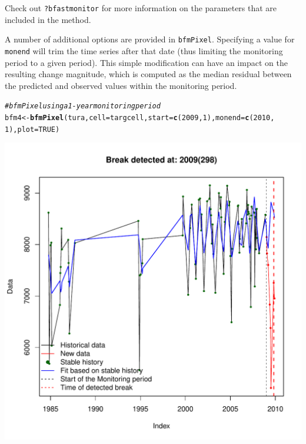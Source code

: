 \documentclass{article}\usepackage[]{graphicx}\usepackage[]{color}
\makeatletter
\def\maxwidth{ %
  \ifdim\Gin@nat@width>\linewidth
    \linewidth
  \else
    \Gin@nat@width
  \fi
}
\newcommand{\hlnum}[1]{\textcolor[rgb]{0.686,0.059,0.569}{#1}}%
\newcommand{\hlcom}[1]{\textcolor[rgb]{0.678,0.584,0.686}{\textit{#1}}}%
\newcommand{\hlstd}[1]{\textcolor[rgb]{0.345,0.345,0.345}{#1}}%
\newcommand{\hlkwb}[1]{\textcolor[rgb]{0.69,0.353,0.396}{#1}}%
\newcommand{\hlkwc}[1]{\textcolor[rgb]{0.333,0.667,0.333}{#1}}%
\newcommand{\hlkwd}[1]{\textcolor[rgb]{0.737,0.353,0.396}{\textbf{#1}}}%
\newenvironment{kframe}{%
 \def\at@end@of@kframe{}%
 \ifinner\ifhmode%
  \def\at@end@of@kframe{\end{minipage}}%
  \begin{minipage}{\columnwidth}%
 \fi\fi%
 \def\FrameCommand##1{\hskip\@totalleftmargin \hskip-\fboxsep
 \colorbox{shadecolor}{##1}\hskip-\fboxsep
     \hskip-\linewidth \hskip-\@totalleftmargin \hskip\columnwidth}%
 \MakeFramed {\advance\hsize-\width
   \@totalleftmargin\z@ \linewidth\hsize
   \@setminipage}}%
 {\par\unskip\endMakeFramed%
 \at@end@of@kframe}
\newenvironment{knitrout}{}{} %
\def\code#1{\texttt{#1}}
\makeatother
\begin{document}
Check out \code{?bfastmonitor} for more information on the parameters that are included in the method.

A number of additional options are provided in \code{bfmPixel}. Specifying a value for \code{monend} will trim the time series after that date (thus limiting the monitoring period to a given period). This simple modification can have an impact on the resulting change magnitude, which is computed as the median residual between the predicted and observed values within the monitoring period.

\begin{knitrout}
\color{fgcolor}\begin{kframe}
\begin{alltt}
\hlcom{# bfmPixel using a 1-year monitoring period}
\hlstd{bfm4} \hlkwb{<-} \hlkwd{bfmPixel}\hlstd{(tura,} \hlkwc{cell} \hlstd{= targcell,} \hlkwc{start} \hlstd{=} \hlkwd{c}\hlstd{(}\hlnum{2009}\hlstd{,} \hlnum{1}\hlstd{),} \hlkwc{monend} \hlstd{=} \hlkwd{c}\hlstd{(}\hlnum{2010}\hlstd{,}
    \hlnum{1}\hlstd{),} \hlkwc{plot} \hlstd{=} \hlnum{TRUE}\hlstd{)}
\end{alltt}
\end{kframe}
\includegraphics[width=\maxwidth]{figure/bfmPixel-monend} 

\end{knitrout}
\end{document}
